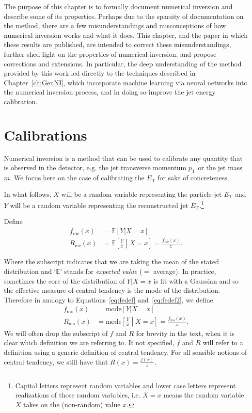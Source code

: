 The purpose of this chapter is to formally document numerical inversion and describe some of its properties. 
Perhaps due to the sparsity of documentation on the method, there are a few misunderstandings and misconceptions of how numerical inversion works and what it does.
This chapter, and the paper in which these results are published, are intended to correct these misunderstandings, further shed light on the properties of numerical inversion, and propose corrections and extensions.
In particular, the deep understanding of the method provided by this work led directly to the techniques described in Chapter~\ref{ch:GenNI}, which incorporate machine learning via neural networks into the numerical inversion process, and in doing so improve the jet energy calibration.

\section{Calibrations}
\label{sec:NI:introclosure}
Numerical inversion is a method that can be used to calibrate any quantity that is observed in the detector, e.g. the jet transverse momentum $p_\text{T}$ or the jet mass $m$.
We focus here on the case of calibrating the $E_\text{T}$ for sake of concreteness.

In what follows, $X$ will be a random variable representing the particle-jet $E_\text{T}$ and $Y$ will be a random variable representing the reconstructed jet $E_\text{T}$.\footnote{Capital letters represent random variables and lower case letters represent realizations of those random variables, i.e. $X=x$ means the random variable $X$ takes on the (non-random) value $x$.}

Define
\begin{align}
\label{eq:fedef}
f_\text{me}(x)&=\mathbb{E}[Y|X=x]\\\label{eq:fedef2}
R_\text{me}(x) &= \mathbb{E}\left[\frac{Y}{x}\middle| X=x\right] = \frac{f_\text{me}(x)}{x}. 
\end{align}

Where the subscript indicates that we are taking the mean of the stated distribution and `$\mathbb{E}$' stands for {\it expected value} ($=$ average). In practice, sometimes the core of the distribution of $Y|X=x$ is fit with a Gaussian and so the effective measure of central tendency is the mode of the distribution.  Therefore in analogy to Equations~\ref{eq:fedef} and~\ref{eq:fedef2}, we define
\begin{align}
f_\text{mo}(x)&=\text{mode}[Y|X=x]\\
R_\text{mo}(x) &= \text{mode}\left[\frac{Y}{x}\middle| X=x\right] = \frac{f_\text{mo}(x)}{x}. 
\end{align}
We will often drop the subscript of $f$ and $R$ for brevity in the text, when it is clear which definition we are referring to. If not specified, $f$ and $R$ will refer to a definition using a generic definition of central tendency.  For all sensible notions of central tendency, we still have that $R(x) = \frac{f(x)}{x}$.

